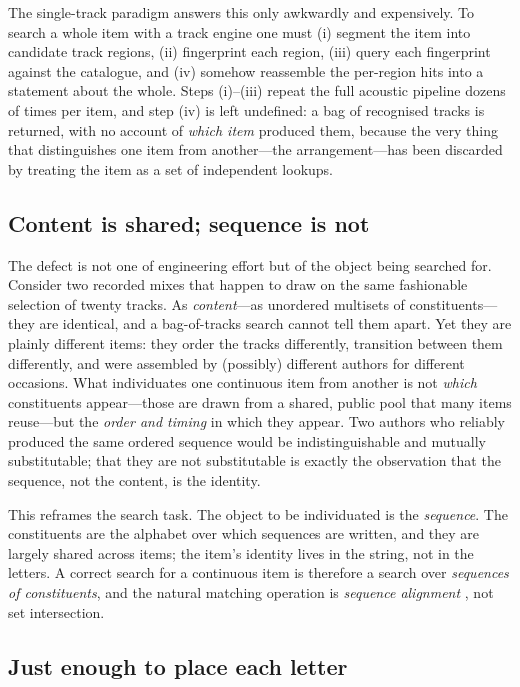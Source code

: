 \documentclass[11pt,twocolumn,a4paper]{article}
\theoremstyle{thmstyle}
\theoremstyle{definition}
\theoremstyle{remark}
\begin{document}
The single-track paradigm answers this only awkwardly and expensively. To search
a whole item with a track engine one must (i) segment the item into candidate
track regions, (ii) fingerprint each region, (iii) query each fingerprint
against the catalogue, and (iv) somehow reassemble the per-region hits into a
statement about the whole. Steps (i)--(iii) repeat the full acoustic pipeline
dozens of times per item, and step (iv) is left undefined: a bag of recognised
tracks is returned, with no account of \emph{which item} produced them, because
the very thing that distinguishes one item from another---the arrangement---has
been discarded by treating the item as a set of independent lookups.

\subsection{Content is shared; sequence is not}

The defect is not one of engineering effort but of the object being searched
for. Consider two recorded mixes that happen to draw on the same fashionable
selection of twenty tracks. As \emph{content}---as unordered multisets of
constituents---they are identical, and a bag-of-tracks search cannot tell them
apart. Yet they are plainly different items: they order the tracks differently,
transition between them differently, and were assembled by (possibly) different
authors for different occasions. What individuates one continuous item from
another is not \emph{which} constituents appear---those are drawn from a shared,
public pool that many items reuse---but the \emph{order and timing} in which
they appear. Two authors who reliably produced the same ordered sequence would
be indistinguishable and mutually substitutable; that they are not
substitutable is exactly the observation that the sequence, not the content, is
the identity.

This reframes the search task. The object to be individuated is the
\emph{sequence}. The constituents are the alphabet over which sequences are
written, and they are largely shared across items; the item's identity lives in
the string, not in the letters. A correct search for a continuous item is
therefore a search over \emph{sequences of constituents}, and the natural
matching operation is \emph{sequence alignment}
\citep{needleman1970,smith1981}, not set intersection.

\subsection{Just enough to place each letter}
\end{document}
